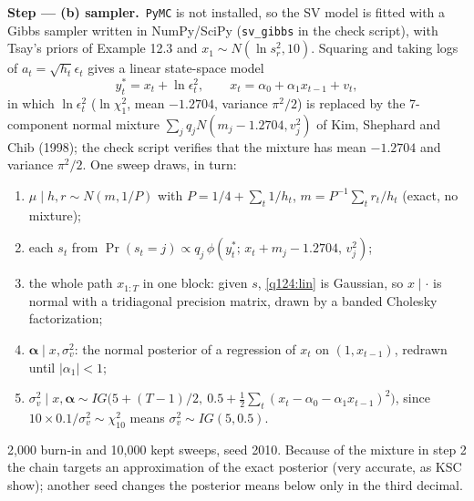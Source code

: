 \documentclass[11pt,a4paper]{article}
\newcommand{\passo}[2]{\par\smallskip\noindent\textbf{Step --- #1.}~#2}
\begin{document}
\begin{sol}
\passo{(b) sampler}{\texttt{PyMC} is not installed, so the SV model is fitted with a Gibbs sampler written in
NumPy/SciPy (\texttt{sv\_gibbs} in the check script), with Tsay's priors of Example 12.3 and
$x_1\sim N(\ln s_r^2,10)$. Squaring and taking logs of $a_t=\sqrt{h_t}\epsilon_t$ gives a linear state-space model}
\begin{equation}\label{q124:lin} y_t^*=x_t+\ln\epsilon_t^2,\qquad x_t=\alpha_0+\alpha_1x_{t-1}+v_t, \end{equation}
in which $\ln\epsilon_t^2$ ($\ln\chi^2_1$, mean $-1.2704$, variance $\pi^2/2$) is replaced by the 7-component
normal mixture $\sum_j q_jN(m_j-1.2704,v_j^2)$ of Kim, Shephard and Chib (1998); the check script verifies
that the mixture has mean $-1.2704$ and variance $\pi^2/2$. One sweep draws, in turn:
\begin{enumerate}[label=\arabic*.,leftmargin=1.6em]
\item $\mu\mid h,r\sim N(m,1/P)$ with $P=1/4+\sum_t1/h_t$, $m=P^{-1}\sum_tr_t/h_t$ (exact, no mixture);
\item each $s_t$ from $\Pr(s_t=j)\propto q_j\,\phi(y_t^*;\,x_t+m_j-1.2704,\,v_j^2)$;
\item the whole path $x_{1:T}$ in one block: given $s$, \eqref{q124:lin} is Gaussian, so $x\mid\cdot$ is normal
with a tridiagonal precision matrix, drawn by a banded Cholesky factorization;
\item $\boldsymbol\alpha\mid x,\sigma_v^2$: the normal posterior of a regression of $x_t$ on $(1,x_{t-1})$,
redrawn until $|\alpha_1|<1$;
\item $\sigma_v^2\mid x,\boldsymbol\alpha\sim IG\big(5+(T-1)/2,\ 0.5+\tfrac12\sum_t(x_t-\alpha_0-\alpha_1x_{t-1})^2\big)$,
since $10\times0.1/\sigma_v^2\sim\chi^2_{10}$ means $\sigma_v^2\sim IG(5,0.5)$.
\end{enumerate}
2,000 burn-in and 10,000 kept sweeps, seed 2010. Because of the mixture in step 2 the chain targets an
approximation of the exact posterior (very accurate, as KSC show); another seed changes the posterior means
below only in the third decimal.


\end{sol}
\end{document}
